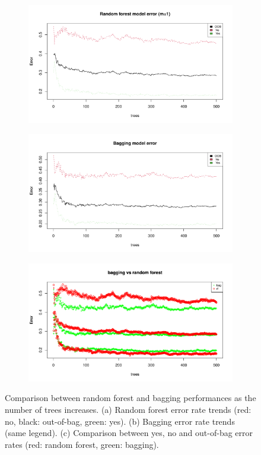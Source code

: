 \begin{figure}[H]
	\centering
	\hfill
	\begin{subfigure}{.5\textwidth}
		\centering
		\includegraphics[width=0.7\linewidth]{ImageFiles/Classification/Trees/best_for_500_plot.pdf}
		\caption{}
		\label{fig:best_for_500_plot}
	\end{subfigure}%
	\hfill
	\begin{subfigure}{.5\textwidth}
		\centering
		\includegraphics[width=0.7\linewidth]{ImageFiles/Classification/Trees/bagg_500_plot.pdf}
		\caption{}
		\label{fig:bagg_500_plot}
	\end{subfigure}
	\begin{subfigure}{.5\textwidth}
		\centering
		\includegraphics[width=0.7\linewidth]{ImageFiles/Classification/Trees/vs_bagg_for_500_plot.pdf}
		\caption{}
		\label{fig:vs_bagg_for_500_plot}
	\end{subfigure}
	\caption{Comparison between random forest and bagging performances as the number of trees increases. (a) Random forest error rate trends (red: no, black: out-of-bag, green: yes). (b) Bagging error rate trends (same legend). (c) Comparison between yes, no and out-of-bag error rates (red: random forest, green: bagging).}
	\label{fig:RFvsB}
\end{figure}

